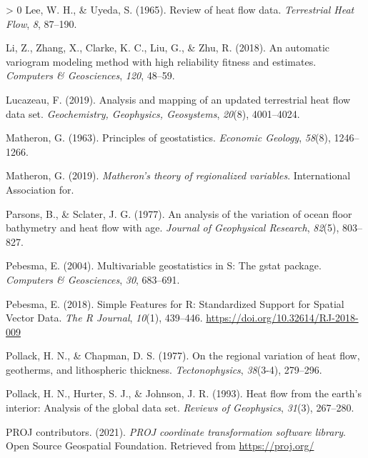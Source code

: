 \documentclass[draft,linenumbers]{agujournal2018}
\newlength{\cslhangindent}
\newenvironment{CSLReferences}[3] %
 {%
  \setlength{\parindent}{0pt}
  \ifodd #1 \everypar{\setlength{\hangindent}{\cslhangindent}}\ignorespaces\fi
  \ifnum #2 > 0
  \setlength{\parskip}{#2\baselineskip}
  \fi
 }%
 {}
\begin{document}
\begin{CSLReferences}{1}{0}
\leavevmode\hypertarget{ref-lee1965}{}%
Lee, W. H., \& Uyeda, S. (1965). Review of heat flow data.
\emph{Terrestrial Heat Flow}, \emph{8}, 87--190.

\leavevmode\hypertarget{ref-li2018}{}%
Li, Z., Zhang, X., Clarke, K. C., Liu, G., \& Zhu, R. (2018). An
automatic variogram modeling method with high reliability fitness and
estimates. \emph{Computers \& Geosciences}, \emph{120}, 48--59.

\leavevmode\hypertarget{ref-lucazeau2019}{}%
Lucazeau, F. (2019). Analysis and mapping of an updated terrestrial heat
flow data set. \emph{Geochemistry, Geophysics, Geosystems},
\emph{20}(8), 4001--4024.

\leavevmode\hypertarget{ref-matheron1963}{}%
Matheron, G. (1963). Principles of geostatistics. \emph{Economic
Geology}, \emph{58}(8), 1246--1266.

\leavevmode\hypertarget{ref-matheron2019}{}%
Matheron, G. (2019). \emph{Matheron's theory of regionalized variables}.
International Association for.

\leavevmode\hypertarget{ref-parsons1977}{}%
Parsons, B., \& Sclater, J. G. (1977). An analysis of the variation of
ocean floor bathymetry and heat flow with age. \emph{Journal of
Geophysical Research}, \emph{82}(5), 803--827.

\leavevmode\hypertarget{ref-pebesma2004}{}%
Pebesma, E. (2004). Multivariable geostatistics in {S}: The gstat
package. \emph{Computers \& Geosciences}, \emph{30}, 683--691.

\leavevmode\hypertarget{ref-pebesma2018}{}%
Pebesma, E. (2018). {Simple Features for R: Standardized Support for
Spatial Vector Data}. \emph{{The R Journal}}, \emph{10}(1), 439--446.
\url{https://doi.org/10.32614/RJ-2018-009}

\leavevmode\hypertarget{ref-pollack1977}{}%
Pollack, H. N., \& Chapman, D. S. (1977). On the regional variation of
heat flow, geotherms, and lithospheric thickness. \emph{Tectonophysics},
\emph{38}(3-4), 279--296.

\leavevmode\hypertarget{ref-pollack1993}{}%
Pollack, H. N., Hurter, S. J., \& Johnson, J. R. (1993). Heat flow from
the earth's interior: Analysis of the global data set. \emph{Reviews of
Geophysics}, \emph{31}(3), 267--280.

\leavevmode\hypertarget{ref-proj2021}{}%
PROJ contributors. (2021). \emph{{PROJ} coordinate transformation
software library}. Open Source Geospatial Foundation. Retrieved from
\url{https://proj.org/}


\end{CSLReferences}
\end{document}
